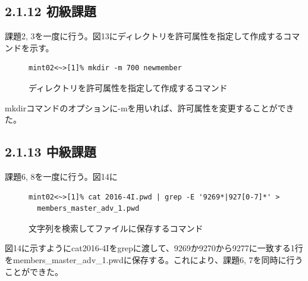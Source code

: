 \documentclass[12pt]{jreport}
\begin{document}
            \subsection*{2.1.12 初級課題}
                課題2, 3を一度に行う。図13にディレクトリを許可属性を指定して作成するコマンドを示す。
                \begin{figure}[H]
                    \begin{center}
                        \begin{screen}
                            \begin{verbatim}
mint02<~>[1]% mkdir -m 700 newmember
                            \end{verbatim}
                        \end{screen}
                        \caption{ディレクトリを許可属性を指定して作成するコマンド}
                        \label{13}
                    \end{center}
                \end{figure}
                mkdirコマンドのオプションに-mを用いれば、許可属性を変更することができた。

            \subsection*{2.1.13 中級課題}
                課題6, 8を一度に行う。図14に
                \begin{figure}[H]
                    \begin{center}
                        \begin{screen}
                            \begin{verbatim}
mint02<~>[1]% cat 2016-4I.pwd | grep -E '9269*|927[0-7]*' > 
  members_master_adv_1.pwd
                            \end{verbatim}
                        \end{screen}
                        \caption{文字列を検索してファイルに保存するコマンド}
                        \label{14}
                    \end{center}
                \end{figure}
                図14に示すようにcat2016-4Iをgrepに渡して、9269か9270から9277に一致する1行をmembers\_master\_adv\_1.pwdに保存する。これにより、課題6, 7を同時に行うことができた。
\end{document}
